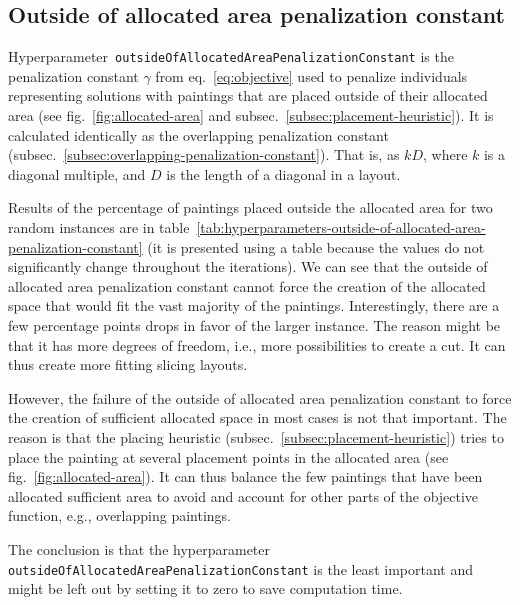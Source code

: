 \subsection{Outside of allocated area penalization constant}\label{subsec:outside-of-allocated-area-penalization-constant}
Hyperparameter~\verb|outsideOfAllocatedAreaPenalizationConstant| is the penalization constant $\gamma$ from eq.~\ref{eq:objective} used to penalize
individuals representing solutions with paintings that are placed outside of their allocated area (see fig.~\ref{fig:allocated-area} and subsec.~\ref{subsec:placement-heuristic}).
It is calculated identically as the overlapping penalization constant (subsec.~\ref{subsec:overlapping-penalization-constant}).
That is, as $kD$, where $k$ is a diagonal multiple, and $D$ is the length of a diagonal in a layout.

Results of the percentage of paintings placed outside the allocated area for two random instances are in table~\ref{tab:hyperparameters-outside-of-allocated-area-penalization-constant}
(it is presented using a table because the values do not significantly change throughout the iterations).
We can see that the outside of allocated area penalization constant cannot force the creation of the allocated space that would fit the vast majority of the paintings.
Interestingly, there are a few percentage points drops in favor of the larger instance.
The reason might be that it has more degrees of freedom, i.e.,  more possibilities to create a cut.
It can thus create more fitting slicing layouts.

However, the failure of the outside of allocated area penalization constant to force
the creation of sufficient allocated space in most cases is not that important.
The reason is that the placing heuristic (subsec.~\ref{subsec:placement-heuristic})
tries to place the painting at several placement points in the allocated area (see fig.~\ref{fig:allocated-area}).
It can thus balance the few paintings that have been allocated sufficient area to avoid
and account for other parts of the objective function, e.g., overlapping paintings.

The conclusion is that the hyperparameter \verb|outsideOfAllocatedAreaPenalizationConstant| is the least
important and might be left out by setting it to zero to save computation time.



